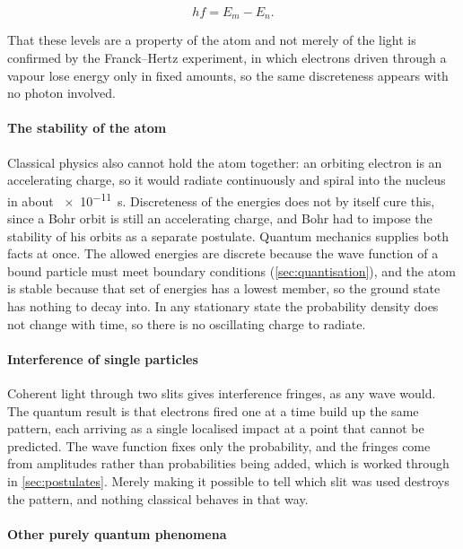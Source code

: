     \begin{equation*}
        hf = E_m - E_n .
    \end{equation*}

    That these levels are a property of the atom and not merely of the light is confirmed by the Franck--Hertz experiment, in which electrons driven through a vapour lose energy only in fixed amounts, so the same discreteness appears with no photon involved.

    \paragraph{The stability of the atom}

    Classical physics also cannot hold the atom together: an orbiting electron is an accelerating charge, so it would radiate continuously and spiral into the nucleus in about \qty{e-11}{\second}. Discreteness of the energies does not by itself cure this, since a Bohr orbit is still an accelerating charge, and Bohr had to impose the stability of his orbits as a separate postulate. Quantum mechanics supplies both facts at once. The allowed energies are discrete because the wave function of a bound particle must meet boundary conditions (\cref{sec:quantisation}), and the atom is stable because that set of energies has a lowest member, so the ground state has nothing to decay into. In any stationary state the probability density does not change with time, so there is no oscillating charge to radiate.

    \paragraph{Interference of single particles}

    Coherent light through two slits gives interference fringes, as any wave would. The quantum result is that electrons fired one at a time build up the same pattern, each arriving as a single localised impact at a point that cannot be predicted. The wave function fixes only the probability, and the fringes come from amplitudes rather than probabilities being added, which is worked through in \cref{sec:postulates}. Merely making it possible to tell which slit was used destroys the pattern, and nothing classical behaves in that way.

    \paragraph{Other purely quantum phenomena}

